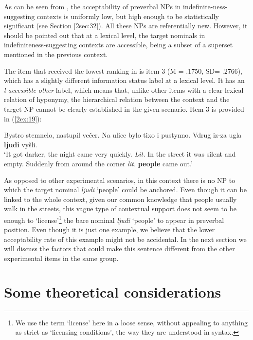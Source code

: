 \documentclass[output=paper]{langsci/langscibook}
\begin{document}
As can be seen from , the acceptability of preverbal NPs in indefinite-ness-suggesting contexts is uniformly low, but high enough to be statistically significant (see Section \ref{2sec:32}). All these NPs are referentially new. However, it should be pointed out that at a lexical level, the target nominals in indefiniteness-suggesting contexts are accessible, being a subset of a superset mentioned in the previous context.

The item that received the lowest ranking in  is item 3 (M = .1750, SD= .2766), which has a slightly different information status label at a lexical level. It has an {\emph{l-accessible-other}} label, which means that, unlike other items with a clear lexical relation of hyponymy, the hierarchical relation between the context and the target NP cannot be clearly established in the given scenario. Item 3 is provided in (\ref{2ex:19}):

\begin{exe}
\ex\label{2ex:19}
Bystro stemnelo, nastupil ve\v{c}er. Na ulice bylo tixo i pustynno. Vdrug iz-za ugla {\textbf{ljudi}} vy\v{s}li. \\
`It got darker, the night came very quickly. 
{\emph{Lit.}} In the street it was silent and empty. Suddenly from around the corner {\emph{lit.}} {\textbf{people}} came out.'
\end{exe}

As opposed to other experimental scenarios, in this context there is no NP to which the target nominal {\emph{ljudi}} `people' could be anchored. Even though it can be linked to the whole context, given our common knowledge that people usually walk in the streets, this vague type of contextual support does not seem to be enough to `license'\footnote{We use the term `license' here in a loose sense, without appealing to anything as strict as `licensing conditions', the way they are understood in syntax.} the bare nominal {\emph{ljudi}} `people' to appear in preverbal position. Even though it is just one example, we believe that the lower acceptability rate of this example might not be accidental. In the next section we will discuss the factors that could make this sentence different from the other experimental items in the same group.


\section{Some theoretical considerations}\label{2sec:4}
\end{document}

